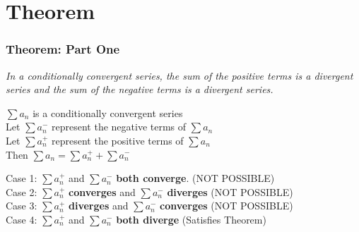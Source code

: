 \documentclass{beamer}
\begin{document}
\section{Theorem}



\begin{frame}
\frametitle{Theorem: Part One}
\textit{In a conditionally convergent series, the sum of the positive terms is a divergent series and the sum of the negative terms is a divergent series.} 
\end{frame}


\begin{frame}
$\sum{a_n}$ is a conditionally convergent series
\\Let $\sum{a_n^{-}}$ represent the negative terms of $\sum{a_n}$ 
\\Let $\sum{a_n^{+}}$ represent the positive terms of $\sum{a_n}$
\\Then $\sum{a_n} = \sum{a_n^{+}} + \sum{a_n^{-}}$
\end{frame}

\begin{frame}
Case 1: $\sum{a_n^{+}}$ and $\sum{a_n^{-}}$ \textbf{both converge}. (NOT POSSIBLE)
\\Case 2: $\sum{a_n^{+}}$ \textbf{converges} and $\sum{a_n^{-}}$ \textbf{diverges} (NOT POSSIBLE)
\\Case 3: $\sum{a_n^{+}}$ \textbf{diverges} and $\sum{a_n^{-}}$ \textbf{converges} (NOT POSSIBLE)
\\Case 4: $\sum{a_n^{+}}$ and $\sum{a_n^{-}}$ \textbf{both diverge} (Satisfies Theorem)
\end{frame}
\end{document}
